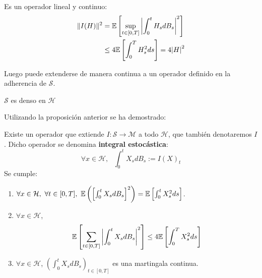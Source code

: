 Es un operador lineal y continuo: 
\begin{align*}
        \| I (H) \|^{2} &= \mathbb{E} \left[ \sup_{t \in [0,T]} \abs{\int_{0}^t H_s dB_s}^2 \right]\\
        &\le 4 \mathbb{E} \left[ \int_{0}^{T} H_s^2 ds \right] = 4 \abs{H}^2
\end{align*}

Luego puede extenderse de manera continua a un operador definido en la adherencia de $\mathcal{S}$. 

\begin{proposition}
        $\mathcal{S}$ es denso en $\mathcal{H}$
\end{proposition}

Utilizando la proposición anterior se ha demostrado:

\begin{proposition}
        Existe un operador que extiende $I:\mathcal{S} \to \mathcal{M}$ a todo
        $\mathcal{H}$, que también denotaremos $I$. Dicho operador se denomina
        \textbf{integral estocástica}:
        \begin{equation*}
                \forall x \in \mathcal{H}, ~ ~ ~ \int_{0}^{t} X_s dB_s  := I(X)_t
        \end{equation*}
Se cumple: 

\begin{enumerate}
        \item \label{IE:i} $\forall x \in \mathcal{H},~ \forall t \in [0,T], ~
                \mathbb{E} \left( \left[ \int_{0}^{t} X_s dB_s \right]^2  \right) =
                \mathbb{E} \left[ \int_{0}^{t} X_s^2 ds  \right]$.
        \item $\label{IE:ii}\forall x \in \mathcal{H}$, 
                \begin{equation*}
                        \mathbb{E} \left[ \sum_{t \in [0,T]} \abs{\int_{0}^{t} X_s
                        dB_s}^2  \right] \le 4 \mathbb{E} \left[ \int_{0}^{T} X_s^2 ds \right]
                \end{equation*}
        \item  \label{IE:iii} $\forall  x \in \mathcal{H}$, $\left(
                \int_{0}^{t} X_s dB_s \right)_{t \in [0,T]}$ es una martingala continua. 
\end{enumerate}

\end{proposition}
